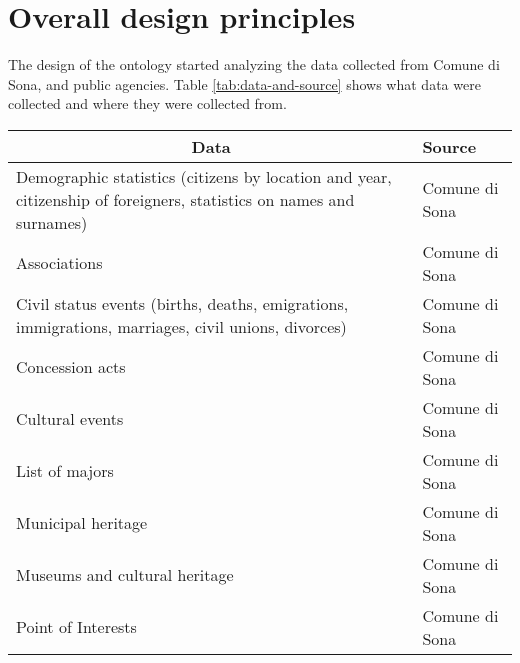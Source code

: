 \section{Overall design principles}
\label{sec:design-principles}

The design of the ontology started analyzing the data collected from Comune di Sona, and public agencies. Table \ref{tab:data-and-source} shows what data were collected and where they were collected from.

\begin{table}[!ht]
  \onehalfspacing
  \centering
  \begin{tabular}{|p{}|p{}|}
  \hline
  \multicolumn{1}{|c|}{\textbf{Data}}                                                         & \textbf{Source} \\ \hline
  Demographic statistics (citizens by location and year, citizenship of foreigners, statistics on names and surnames) & Comune di Sona                    \\ \hline
  Associations                                                                                                        & Comune di Sona                    \\ \hline
  Civil status events (births, deaths, emigrations, immigrations, marriages, civil unions, divorces)                  & Comune di Sona                    \\ \hline
  Concession acts                                                                                                     & Comune di Sona                    \\ \hline
  Cultural events                                                                                                     & Comune di Sona                    \\ \hline
  List of majors                                                                                                      & Comune di Sona                    \\ \hline
  Municipal heritage                                                                                                  & Comune di Sona                    \\ \hline
  Museums and cultural heritage                                                                                       & Comune di Sona                    \\ \hline
  Point of Interests                                                                                                  & Comune di Sona                    \\ \hline

\end{tabular}
\end{table}
